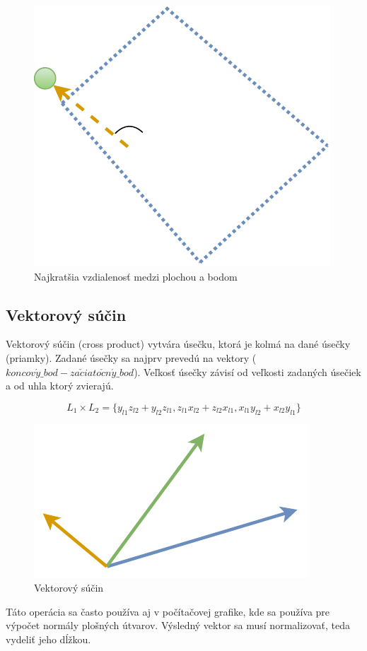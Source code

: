 \begin{figure}[H]
	\centering
	\includegraphics[height=0.3\textwidth]{obrazky-figures/Diagram/Draw/2Line/DP Navrh operacii-1D - LineMinSP.pdf}
	\caption{Najkratšia vzdialenosť medzi plochou a bodom}
	\label{fig:LineMinSP}
\end{figure}


\subsection*{Vektorový súčin}\label{subsec:crossproduct}
Vektorový súčin (cross product) vytvára úsečku, ktorá je kolmá na dané úsečky (priamky). Zadané úsečky sa najprv prevedú na vektory ($koncov\acute{y}\_bod - za\check{c}iato\check{c}n\acute{y}\_bod$).
Veľkosť úsečky závisí od veľkosti zadaných úsečiek a od uhla ktorý zvierajú. 

\begin{equation}
 L_1 \times L_2 =  \{
 y_{l1} z_{l2} + y_{l2} z_{l1} ,
 z_{l1} x_{l2} + z_{l2} x_{l1} ,
 x_{l1} y_{l2} + x_{l2} y_{l1}\}
    \label{eq:cross}
\end{equation}


\begin{figure}[H]
	\centering
	\includegraphics[height=0.3\textwidth]{obrazky-figures/Diagram/Draw/2Line/DP Navrh operacii-1D - LineCross.pdf}
	\caption{Vektorový súčin}
	\label{fig:LineCross}
\end{figure}

Táto operácia sa často používa aj v počítačovej grafike, kde sa používa pre výpočet normály plošných útvarov. Výsledný vektor sa musí normalizovať, teda vydeliť jeho dĺžkou.



